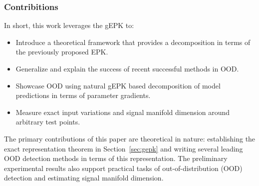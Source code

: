 \begin{frame}
  \frametitle{Contribitions}
  In short, this work leverages the gEPK to:
\begin{itemize}
    \item Introduce a theoretical framework that provides a decomposition in terms of the previously proposed EPK. %
    \item Generalize and explain the success of recent successful methods in OOD.
    \item Showcase OOD using natural gEPK based decomposition of model predictions in terms of parameter gradients.
    \item Measure exact input variations and signal manifold dimension
      around arbitrary test points.


\end{itemize}
The primary contributions of this paper are theoretical in nature: establishing the exact representation theorem in Section~\ref{sec:gepk} and writing several leading OOD detection methods in terms of this representation. The preliminary experimental results also support practical tasks of out-of-distribution (OOD) detection and estimating signal manifold dimension. 
      \end{frame}
\label{sec:input}





